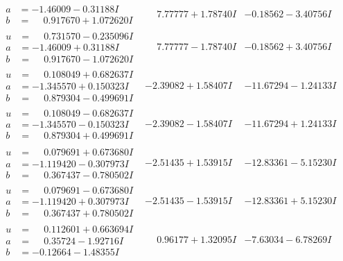 \documentclass[1p]{elsarticle_modified}
\theoremstyle{definition}
\begin{document}
$$\begin{array}{c|c|c}
\begin{aligned}
a &= -1.46009 - 0.31188 I \\
b &= \phantom{-}0.917670 + 1.072620 I\end{aligned}
 & \phantom{-}7.77777 + 1.78740 I & -0.18562 - 3.40756 I \\ \hline\begin{aligned}
u &= \phantom{-}0.731570 - 0.235096 I \\
a &= -1.46009 + 0.31188 I \\
b &= \phantom{-}0.917670 - 1.072620 I\end{aligned}
 & \phantom{-}7.77777 - 1.78740 I & -0.18562 + 3.40756 I \\ \hline\begin{aligned}
u &= \phantom{-}0.108049 + 0.682637 I \\
a &= -1.345570 + 0.150323 I \\
b &= \phantom{-}0.879304 - 0.499691 I\end{aligned}
 & -2.39082 + 1.58407 I & -11.67294 - 1.24133 I \\ \hline\begin{aligned}
u &= \phantom{-}0.108049 - 0.682637 I \\
a &= -1.345570 - 0.150323 I \\
b &= \phantom{-}0.879304 + 0.499691 I\end{aligned}
 & -2.39082 - 1.58407 I & -11.67294 + 1.24133 I \\ \hline\begin{aligned}
u &= \phantom{-}0.079691 + 0.673680 I \\
a &= -1.119420 - 0.307973 I \\
b &= \phantom{-}0.367437 - 0.780502 I\end{aligned}
 & -2.51435 + 1.53915 I & -12.83361 - 5.15230 I \\ \hline\begin{aligned}
u &= \phantom{-}0.079691 - 0.673680 I \\
a &= -1.119420 + 0.307973 I \\
b &= \phantom{-}0.367437 + 0.780502 I\end{aligned}
 & -2.51435 - 1.53915 I & -12.83361 + 5.15230 I \\ \hline\begin{aligned}
u &= \phantom{-}0.112601 + 0.663694 I \\
a &= \phantom{-}0.35724 - 1.92716 I \\
b &= -0.12664 - 1.48355 I\end{aligned}
 & \phantom{-}0.96177 + 1.32095 I & -7.63034 - 6.78269 I \\ \hline\begin{aligned}

\end{aligned}
\end{array}$$
\end{document}
